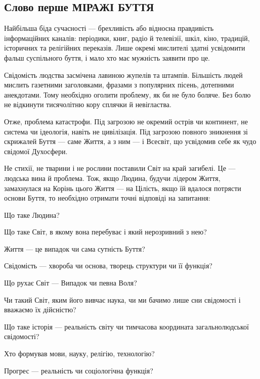  
 

\subsection{Слово перше МІРАЖІ БУТТЯ}

Найбільша біда сучасності — брехливість або відносна правдивість інформаційних
каналів: періодики, книг, радіо й телевізії, шкіл, кіно, традицій, історичних
та релігійних переказів. Лише окремі мислителі здатні усвідомити фальш
суспільного буття, і мало хто має мужність заявити про це.

Свідомість людства засмічена лавиною жупелів та штампів. Більшість людей
мислить газетними заголовками, фразами з популярних пісень, дотепними
анекдотами. Тому необхідно оголити проблему, як би не було боляче. Без болю не
відкинути тисячолітню кору сплячки й невігластва.

Отже, проблема катастрофи. Під загрозою не окремий острів чи континент, не
система чи ідеологія, навіть не цивілізація. Під загрозою повного зникнення зі
скрижалей Буття — саме Життя, а з ним — і Всесвіт, що усвідомив себе як чудо
свідомої Духосфери.

Не стихії, не тварини і не рослини поставили Світ на край загибелі. Це —
людська вина й проблема. Тож, якщо Людина, будучи лідером Життя, замахнулася на
Корінь цього Життя — на Цілість, якщо їй вдалося потрясти основи Буття, то
необхідно отримати точні відповіді на запитання:

Що таке Людина?

Що таке Світ, в якому вона перебуває і який нерозривний з нею?

Життя — це випадок чи сама сутність Буття?

Свідомість — хвороба чи основа, творець структури чи її функція?

Що рухає Світ — Випадок чи певна Воля?

Чи такий Світ, яким його вивчає наука, чи ми бачимо лише сни свідомості і
вважаємо їх дійсністю?

Що таке історія — реальність світу чи тимчасова координата загальнолюдської
свідомості?

Хто формував мови, науку, релігію, технологію?

Прогрес — реальність чи соціологічна функція?

